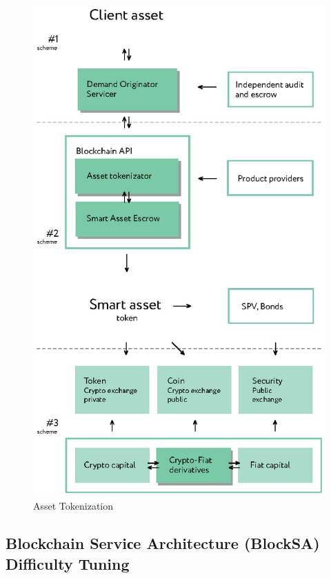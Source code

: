 \documentclass{article}
\begin{document}

\begin{figure}
  \centering
  \includegraphics[width=\columnwidth]{asset-tokenization.eps}
  \caption{Asset Tokenization}
  \label{fig:tokenization}
\end{figure}


\subsection{Blockchain Serviсe Architecture (BlockSA) Difficulty Tuning}
\end{document}
